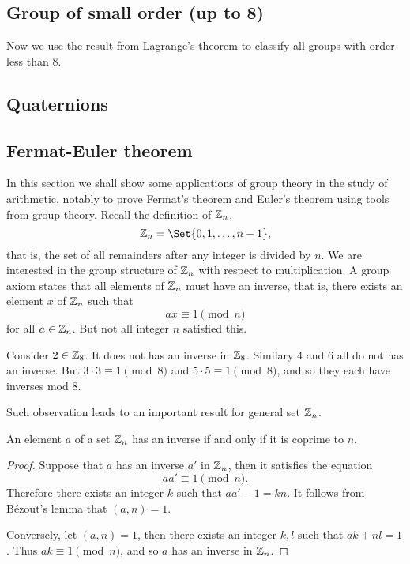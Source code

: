 \documentclass[main.tex]{subfiles}
\begin{document}
			\subsection{Group of small order (up to 8)}
				Now we use the result from Lagrange's theorem to classify all groups with order less than 8.
			\subsection{Quaternions}
			
			\subsection{Fermat-Euler theorem}
			In this section we shall show some applications of group theory in the study of arithmetic, notably to prove Fermat's theorem and Euler's theorem using tools from group theory. Recall the definition of $\mathbb Z_n$,
			\begin{equation*}
				\ZZ_n = \Set{0, 1, \ldots, n - 1},
			\end{equation*}
			that is, the set of all remainders after any integer is divided by $n$. We are interested in the group structure of $\mathbb Z_n$ with respect to multiplication. A group axiom states that all elements of $\mathbb Z_n$ must have an inverse, that is, there exists an element $x$ of $\mathbb Z_n$ such that
			\begin{equation*}
				ax \equiv 1	\pmod n
			\end{equation*} 
			for all $a \in \mathbb Z_n$. But not all integer $n$ satisfied this. 
			\begin{example}
				Consider $2 \in \mathbb Z_8$. It does not has an inverse in $\mathbb Z_8$. Similary 4 and 6 all do not has an inverse. But $3\cdot 3 \equiv 1 \pmod 8$ and $5 \cdot 5 \equiv 1 \pmod 8$, and so they each have inverses mod 8.
			\end{example}  
			Such observation leads to an important result for general set $\mathbb Z_n$.
			\begin{theorem}
				An element $a$ of a set $\mathbb Z_n$ has an inverse if and only if it is coprime to $n$.
			\end{theorem}
			\begin{proof}
				Suppose that $a$ has an inverse $a'$ in $\mathbb Z_n$, then it satisfies the equation
				\begin{equation*}
					aa' \equiv 1 \pmod {n} .
				\end{equation*}
				Therefore there exists an integer $k$ such that $aa' - 1 = kn$. It follows from B\'ezout's lemma that $(a, n) = 1$.
				
				Conversely, let $(a, n) = 1$, then there exists an integer $k, l$ such that $ak + nl = 1$. Thus $ak \equiv 1 \pmod n$, and so $a$ has an inverse in $\mathbb Z_n$.
			\end{proof}
\end{document}
